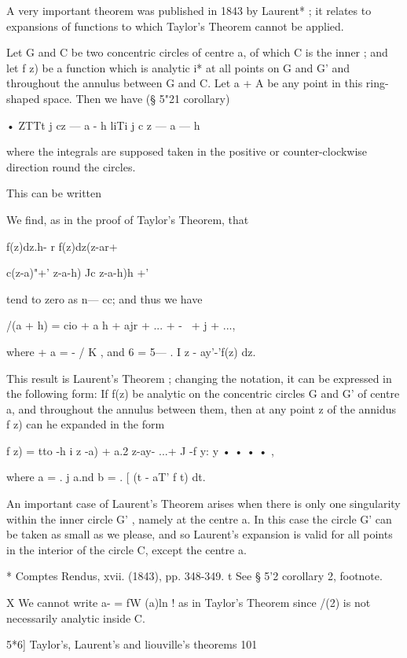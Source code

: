 {{A very important theorem was published in 1843 by Laurent* ; it relates 
to expansions of functions to which Taylor's Theorem cannot be applied. 

Let G and C be two concentric circles of centre a, of which C is the inner ; 
and let f z) be a function which is analytic i* at all points on G and G' and 
throughout the annulus between G and C. Let a + A be any point in this 
ring-shaped space. Then we have (§ 5"21 corollary) 

•  ZTTt j cz — a - h liTi j c z — a — h 

where the integrals are supposed taken in the positive or counter-clockwise 
direction round the circles. 



This can be written 

We find, as in the proof of Taylor's Theorem, that 

f(z)dz.h-  r f(z)dz(z-ar+  

c(z-a)"+' z-a-h) Jc  z-a-h)h +' 

tend to zero as n— cc; and thus we have 

/(a + h) = cio + a h + ajr + ... + -~ + j + ..., 

where + a  =  - /  K , and 6  =  5— . I  z - ay'-'f(z) dz. 

This result is Laurent's Theorem ; changing the notation, it can be 
expressed in the following form: If f(z) be analytic on the concentric circles 
G and G' of centre a, and throughout the annulus between them, then at any 
point z of the annidus f z) can he expanded in the form 

f z) = tto -h  i  z -a) + a.2 z-ay-  ...+ J  -f  y: y  • • • • , 

where a  =  . j    a.nd b  =  . [  (t - aT' f t) dt. 

An important case of Laurent's Theorem arises when there is only one 
singularity within the inner circle G' , namely at the centre a. In this case 
the circle G' can be taken as small as we please, and so Laurent's expansion 
is valid for all points in the interior of the circle C, except the centre a. 

* Comptes Rendus, xvii. (1843), pp. 348-349. 
t See § 5'2 corollary 2, footnote. 

X We cannot write a-  = fW (a)ln ! as in Taylor's Theorem since /(2) is not necessarily analytic 
inside C. 



5*6] Taylor's, Laurent's and liouville's theorems 101 

}}
